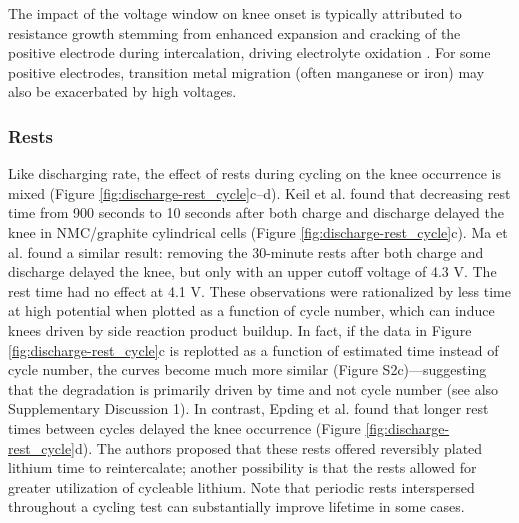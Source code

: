 \documentclass[journal=jpclcd,manuscript=article]{achemso}
\begin{document}
The impact of the voltage window on knee onset is typically attributed to resistance growth stemming from enhanced expansion and cracking of the positive electrode during intercalation, driving electrolyte oxidation \cite{broussely_main_2005, ma_editors_2019, aiken_accelerated_2020}. For some positive electrodes, transition metal migration (often manganese or iron) may also be exacerbated by high voltages. \cite{joshi_effects_2014, gilbert_transition_2017, ma_novel_2019}

\subsubsection{Rests}

Like discharging rate, the effect of rests during cycling on the knee occurrence is mixed (Figure \ref{fig:discharge-rest_cycle}c--d).
Keil et al.\cite{keil_linear_2019} found that decreasing rest time from 900 seconds to 10 seconds after both charge and discharge delayed the knee in NMC/graphite cylindrical cells (Figure \ref{fig:discharge-rest_cycle}c).
Ma et al.\cite{ma_editors_2019} found a similar result: removing the 30-minute rests after both charge and discharge delayed the knee, but only with an upper cutoff voltage of 4.3 V. The rest time had no effect at 4.1 V.
These observations were rationalized by less time at high potential when plotted as a function of cycle number, which can induce knees driven by side reaction product buildup.
In fact, if the data in Figure \ref{fig:discharge-rest_cycle}c is replotted as a function of estimated time instead of cycle number, the curves become much more similar (Figure S2c)---suggesting that the degradation is primarily driven by time and not cycle number (see also Supplementary Discussion 1).
In contrast, Epding et al.\cite{epding_investigation_2019} found that longer rest times between cycles delayed the knee occurrence (Figure \ref{fig:discharge-rest_cycle}d). The authors proposed that these rests offered reversibly plated lithium time to reintercalate; another possibility is that the rests allowed for greater utilization of cycleable lithium\cite{rashid_effect_2015}.
Note that periodic rests interspersed throughout a cycling test can substantially improve lifetime in some cases\cite{raj_investigation_2020}.
\end{document}
